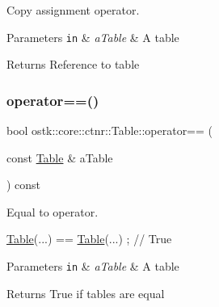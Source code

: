 Copy assignment operator. 


\begin{DoxyParams}[1]{Parameters}
\mbox{\tt in}  & {\em a\+Table} & A table \\
\hline
\end{DoxyParams}
\begin{DoxyReturn}{Returns}
Reference to table 
\end{DoxyReturn}
\mbox{\label{classostk_1_1core_1_1ctnr_1_1_table_afc0baa8593eaa0c3720c098e7bfdfe3a}} 
\subsubsection{\texorpdfstring{operator==()}{operator==()}}
{\footnotesize\ttfamily bool ostk\+::core\+::ctnr\+::\+Table\+::operator== (\begin{DoxyParamCaption}\item[{const \hyperlink{classostk_1_1core_1_1ctnr_1_1_table}{Table} \&}]{a\+Table }\end{DoxyParamCaption}) const}



Equal to operator. 


\begin{DoxyCode}
\hyperlink{classostk_1_1core_1_1ctnr_1_1_table_a1b799fa804faf23f9dd4905df90a5cd7}{Table}(...) == \hyperlink{classostk_1_1core_1_1ctnr_1_1_table_a1b799fa804faf23f9dd4905df90a5cd7}{Table}(...) ; \textcolor{comment}{// True}
\end{DoxyCode}



\begin{DoxyParams}[1]{Parameters}
\mbox{\tt in}  & {\em a\+Table} & A table \\
\hline
\end{DoxyParams}
\begin{DoxyReturn}{Returns}
True if tables are equal 
\end{DoxyReturn}
\mbox{\label{classostk_1_1core_1_1ctnr_1_1_table_a7195c6f21811425473ecabfc5cc0340c}} 
